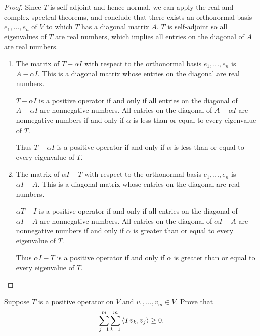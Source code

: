 \begin{proof}
    Since $T$ is self-adjoint and hence normal, we can apply the real and complex spectral theorems, and conclude that there exists an orthonormal basis $e_{1}, \ldots, e_{n}$ of $V$ to which $T$ has a diagonal matrix $A$. $T$ is self-adjoint so all eigenvalues of $T$ are real numbers, which implies all entries on the diagonal of $A$ are real numbers.
    \begin{enumerate}[label={(\alph*)}]
        \item The matrix of $T - \alpha I$ with respect to the orthonormal basis $e_{1}, \ldots, e_{n}$ is $A - \alpha I$. This is a diagonal matrix whose entries on the diagonal are real numbers.

              $T - \alpha I$ is a positive operator if and only if all entries on the diagonal of $A - \alpha I$ are nonnegative numbers. All entries on the diagonal of $A - \alpha I$ are nonnegative numbers if and only if $\alpha$ is less than or equal to every eigenvalue of $T$.

              Thus $T - \alpha I$ is a positive operator if and only if $\alpha$ is less than or equal to every eigenvalue of $T$.
        \item The matrix of $\alpha I - T$ with respect to the orthonormal basis $e_{1}, \ldots, e_{n}$ is $\alpha I - A$. This is a diagonal matrix whose entries on the diagonal are real numbers.

              $\alpha T - I$ is a positive operator if and only if all entries on the diagonal of $\alpha I - A$ are nonnegative numbers. All entries on the diagonal of $\alpha I - A$ are nonnegative numbers if and only if $\alpha$ is greater than or equal to every eigenvalue of $T$.

              Thus $\alpha I - T$ is a positive operator if and only if $\alpha$ is greater than or equal to every eigenvalue of $T$.
    \end{enumerate}
\end{proof}
\newpage

\begin{exercise}
    Suppose $T$ is a positive operator on $V$ and $v_{1}, \ldots, v_{m} \in V$. Prove that
    \[
        \sum^{m}_{j=1}\sum^{m}_{k=1}\left\langle{Tv_{k}, v_{j}}\right\rangle \geq 0.
    \]
\end{exercise}

